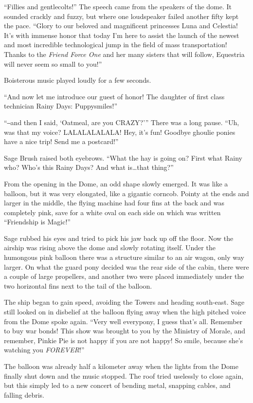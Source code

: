``Fillies and gentlecolts!'' The speech came from the speakers of the dome. It sounded crackly and fuzzy, but where one loudspeaker failed another fifty kept the pace. ``Glory to our beloved and magnificent princesses Luna and Celestia! It's with immense honor that today I'm here to assist the launch of the newest and most incredible technological jump in the field of mass transportation! Thanks to the \emph{Friend Force One} and her many sisters that will follow, Equestria will never seem so small to you!''

Boisterous music played loudly for a few seconds.

``And now let me introduce our guest of honor! The daughter of first class technician Rainy Days: Puppysmiles!''

``‒and then I said, `Oatmeal, are you CRAZY?''' There was a long pause. ``Uh, was that my voice? LALALALALALA! Hey, it's fun! Goodbye ghoulie ponies have a nice trip! Send me a postcard!''

Sage Brush raised both eyebrows. ``What the hay is going on? First what Rainy who? Who's this Rainy Days? And what is\dots that thing?''

From the opening in the Dome, an odd shape slowly emerged. It was like a balloon, but it was very elongated, like a gigantic corncob. Pointy at the ends and larger in the middle, the flying machine had four fins at the back and was completely pink, save for a white oval on each side on which was written ``Friendship is Magic!''

Sage rubbed his eyes and tried to pick his jaw back up off the floor. Now the airship was rising above the dome and slowly rotating itself. Under the humongous pink balloon there was a structure similar to an air wagon, only way larger. On what the guard pony decided was the rear side of the cabin, there were a couple of large propellers, and another two were placed immediately under the two horizontal fins next to the tail of the balloon.

The ship began to gain speed, avoiding the Towers and heading south-east. Sage still looked on in disbelief at the balloon flying away when the high pitched voice from the Dome spoke again. ``Very well everypony, I guess that's all. Remember to buy war bonds! This show was brought to you by the Ministry of Morale, and remember, Pinkie Pie is not happy if you are not happy! So smile, because she's watching you \emph{FOREVER}!''

The balloon was already half a kilometer away when the lights from the Dome finally shut down and the music stopped. The roof tried uselessly to close again, but this simply led to a new concert of bending metal, snapping cables, and falling debris.

